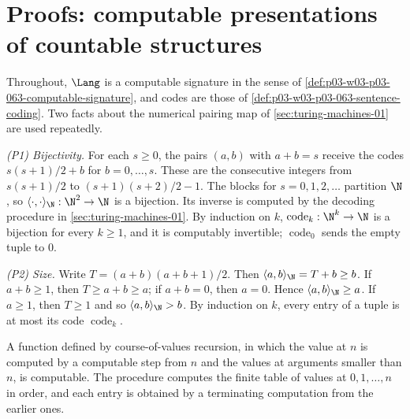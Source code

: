 \section{Proofs: computable presentations of countable structures}
\label{sec:annex-p03-w03-p03-063-computable-presentations}

Throughout, \(\Lang\) is a computable signature in the sense of
\cref{def:p03-w03-p03-063-computable-signature}, and codes are those of
\cref{def:p03-w03-p03-063-sentence-coding}.  Two facts about the numerical
pairing map of \cref{sec:turing-machines-01} are used repeatedly.

\emph{(P1) Bijectivity.}  For each \(s\geq0\), the pairs \((a,b)\) with
\(a+b=s\) receive the codes \(s(s+1)/2+b\) for \(b=0,\ldots,s\).  These are
the consecutive integers from \(s(s+1)/2\) to \((s+1)(s+2)/2-1\).  The blocks
for \(s=0,1,2,\ldots\) partition \(\N\), so
\(\langle\cdot,\cdot\rangle_{\N}:\N^2\to\N\) is a bijection.  Its inverse is
computed by the decoding procedure in \cref{sec:turing-machines-01}.  By induction on \(k\),
\(\operatorname{code}_k:\N^k\to\N\) is a bijection for every \(k\geq1\), and
it is computably invertible; \(\operatorname{code}_0\) sends the empty tuple
to \(0\).

\emph{(P2) Size.}  Write \(T=(a+b)(a+b+1)/2\).  Then
\(\langle a,b\rangle_{\N}=T+b\geq b\).  If \(a+b\geq1\), then
\(T\geq a+b\geq a\); if \(a+b=0\), then \(a=0\).  Hence
\(\langle a,b\rangle_{\N}\geq a\).  If \(a\geq1\), then \(T\geq1\) and so
\(\langle a,b\rangle_{\N}>b\).  By induction on \(k\), every entry of a tuple
is at most its code \(\operatorname{code}_k\).

A function defined by course-of-values recursion, in which the value at \(n\)
is computed by a computable step from \(n\) and the values at arguments
smaller than \(n\), is computable.  The procedure computes the finite table of
values at \(0,1,\ldots,n\) in order, and each entry is obtained by a
terminating computation from the earlier ones.


